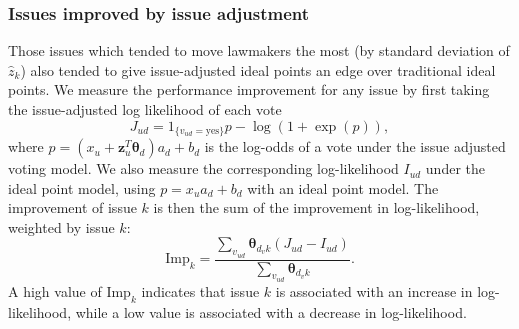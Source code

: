 \subsubsection{Issues improved by issue adjustment}
Those issues which tended to move lawmakers the most (by standard
deviation of $\hat z_k$) also tended to give issue-adjusted ideal
points an edge over traditional ideal points.  We measure the
performance improvement for any issue by first taking the
issue-adjusted log likelihood of each vote
\begin{equation}
  J_{ud} = 1_{\{v_{ud} = \mbox{yes}\}} p - \log(1 + \exp(p)),
\end{equation}
where $p = (x_u + \bm z_{u}^T \bm \theta_d ) a_d + b_d$ is the
log-odds of a vote under the issue adjusted voting model.  We also
measure the corresponding log-likelihood $I_{ud}$ under the ideal
point model, using $p=x_u a_d + b_d$ with an ideal point model. The
improvement of issue $k$ is then the sum of the improvement in
log-likelihood, weighted by issue $k$:
\begin{equation}
  \label{eq:likelihood_improvement}
  \mbox{Imp}_k = \frac{\sum_{v_{ud}} \bm \theta_{d_v k} (J_{ud} - I_{ud}) }
       { \sum_{v_{ud}} \bm \theta_{d_v k} }.
\end{equation}
A high value of $\mbox{Imp}_k$ indicates that issue $k$ is associated
with an increase in log-likelihood, while a low value is associated
with a decrease in log-likelihood.

